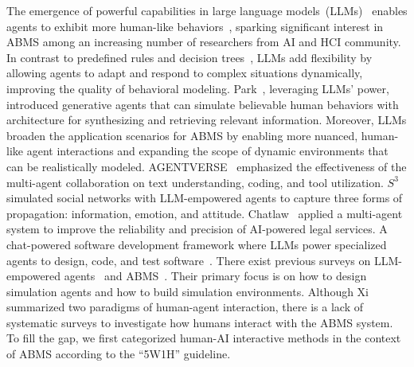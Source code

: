 The emergence of powerful capabilities in large language models~(LLMs)~\cite{bommasani2022opportunities,brown_language_2020} enables agents to exhibit more human-like behaviors~\cite{NBERw31122}, sparking significant interest in ABMS among an increasing number of researchers from AI and HCI community.
In contrast to predefined rules and decision trees~\cite{marcotte_behavior_2017}, LLMs add flexibility by allowing agents to adapt and respond to complex situations dynamically, improving the quality of behavioral modeling.
Park\etal~\cite{10.1145/3586183.3606763}, leveraging LLMs' power, introduced generative agents that can simulate believable human behaviors with architecture for synthesizing and retrieving relevant information.
Moreover, LLMs broaden the application scenarios for ABMS by enabling more nuanced, human-like agent interactions and expanding the scope of dynamic environments that can be realistically modeled.
AGENTVERSE~\cite{chen2023agentversefacilitatingmultiagentcollaboration} emphasized the effectiveness of the multi-agent collaboration on text understanding, coding, and tool utilization.
$S^3$~\cite{gao2023s3socialnetworksimulationlarge} simulated social networks with LLM-empowered agents to capture three forms of propagation: information, emotion, and attitude.
Chatlaw~\cite{cui2024chatlawmultiagentcollaborativelegal} applied a multi-agent system to improve the reliability and precision of AI-powered legal services.
A chat-powered software development framework where LLMs power specialized agents to design, code, and test software~\cite {qian2024chatdevcommunicativeagentssoftware}.
There exist previous surveys on LLM-empowered agents~\cite{xi2023risepotentiallargelanguage,wang_survey_2024} and ABMS~\cite{gao_large_2023}.
Their primary focus is on how to design simulation agents and how to build simulation environments.
Although Xi\etal~\cite{xi2023risepotentiallargelanguage} summarized two paradigms of human-agent interaction, there is a lack of systematic surveys to investigate how humans interact with the ABMS system.
To fill the gap, we first categorized human-AI interactive methods in the context of ABMS according to the ``5W1H'' guideline.


